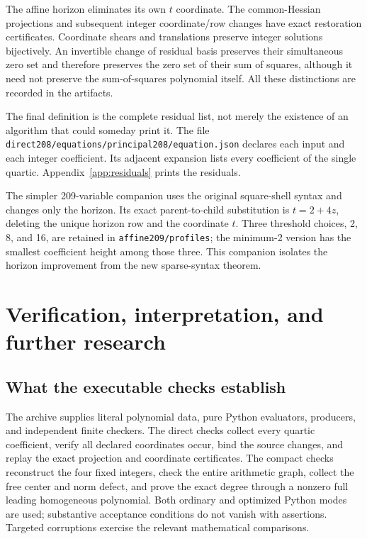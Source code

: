 \documentclass[11pt,letterpaper]{article}
\theoremstyle{remark}\newtheorem{remark}[theorem]{Remark}
\newcommand{\code}[1]{\nolinkurl{#1}}
\begin{document}
The affine horizon eliminates its own $t$ coordinate. The common-Hessian
projections and subsequent integer coordinate/row changes have exact
restoration certificates. Coordinate shears and translations preserve
integer solutions bijectively. An invertible change of residual basis
preserves their simultaneous zero set and therefore preserves the zero
set of their sum of squares, although it need not preserve the sum-of-squares
polynomial itself. All these distinctions are recorded in the artifacts.

The final definition is the complete residual list, not merely the
existence of an algorithm that could someday print it. The file
\code{direct208/equations/principal208/equation.json} declares each input and each integer
coefficient. Its adjacent expansion lists every coefficient of the
single quartic. Appendix~\ref{app:residuals} prints the residuals.

The simpler 209-variable companion uses the original square-shell
syntax and changes only the horizon. Its exact parent-to-child
substitution is $t=2+4z$, deleting the unique horizon row and the
coordinate $t$. Three threshold choices, 2, 8, and 16, are retained in
\code{affine209/profiles}; the minimum-2 version has the smallest
coefficient height among those three. This companion isolates the
horizon improvement from the new sparse-syntax theorem.



\section{Verification, interpretation, and further research}
\label{sec:verification}

\subsection{What the executable checks establish}

The archive supplies literal polynomial data, pure Python evaluators,
producers, and independent finite checkers. The direct checks collect
every quartic coefficient, verify all declared coordinates occur, bind
the source changes, and replay the exact projection and coordinate
certificates. The compact checks reconstruct the four fixed integers,
check the entire arithmetic graph, collect the free center and norm
defect, and prove the exact degree through a nonzero full leading
homogeneous polynomial. Both ordinary and optimized Python modes are
used; substantive acceptance conditions do not vanish with assertions.
Targeted corruptions exercise the relevant mathematical comparisons.
\end{document}
